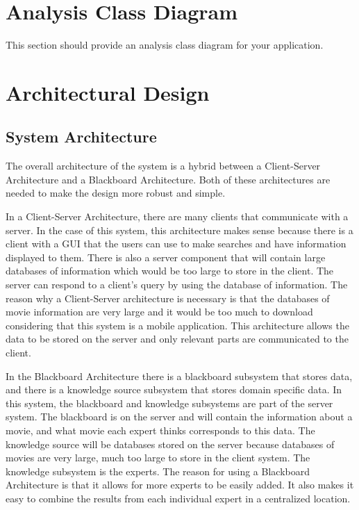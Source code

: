 \documentclass[]{article}
\begin{document}
\section{Analysis Class Diagram}
\label{sec:analysis_class_diagram}
This section should provide an analysis class diagram for your application.


\section{Architectural Design}
\label{sec:architectural_design}

\subsection{System Architecture}
\label{sub:system_architecture}
The overall architecture of the system is a hybrid between a Client-Server Architecture and a Blackboard Architecture. Both of these architectures are needed to make the design more robust and simple.

In a Client-Server Architecture, there are many clients that communicate with a server. In the case of this system, this architecture makes sense because there is a client with a GUI that the users can use to make searches and have information displayed to them. There is also a server component that will contain large databases of information which would be too large to store in the client. The server can respond to a client's query by using the database of information. The reason why a Client-Server architecture is necessary is that the databases of movie information are very large and it would be too much to download considering that this system is a mobile application. This architecture allows the data to be stored on the server and only relevant parts are communicated to the client.

In the Blackboard Architecture there is a blackboard subsystem that stores data, and there is a knowledge source subsystem that stores domain specific data. In this system, the blackboard and knowledge subsystems are part of the server system. The blackboard is on the server and will contain the information about a movie, and what movie each expert thinks corresponds to this data. The knowledge source will be databases stored on the server because databases of movies are very large, much too large to store in the client system. The knowledge subsystem is the experts. The reason for using a Blackboard Architecture is that it allows for more experts to be easily added. It also makes it easy to combine the results from each individual expert in a centralized location.
\end{document}
